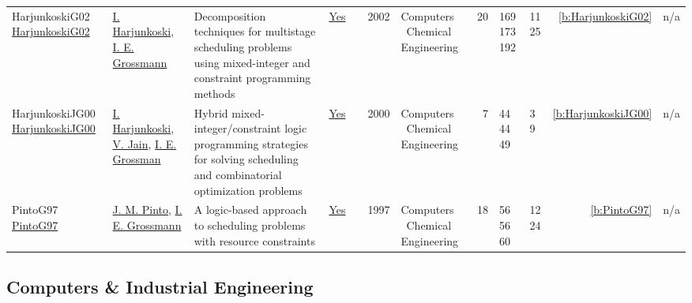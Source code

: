{\begin{longtable}{>{\raggedright\arraybackslash}p{3cm}>{\raggedright\arraybackslash}p{4.5cm}>{\raggedright\arraybackslash}p{6.0cm}rrrp{2.5cm}rp{1cm}p{1cm}rr}
HarjunkoskiG02 \href{http://dx.doi.org/10.1016/s0098-1354(02)00100-x}{HarjunkoskiG02} & \hyperref[auth:a871]{I. Harjunkoski}, \hyperref[auth:a382]{I. E. Grossmann} & Decomposition techniques for multistage scheduling problems using mixed-integer and constraint programming methods & \href{../works/HarjunkoskiG02.pdf}{Yes} & \cite{HarjunkoskiG02} & 2002 & Computers \  Chemical Engineering & 20 & 169 173 192 & 11 25 & \ref{b:HarjunkoskiG02} & n/a\\
HarjunkoskiJG00 \href{http://dx.doi.org/10.1016/s0098-1354(00)00470-1}{HarjunkoskiJG00} & \hyperref[auth:a871]{I. Harjunkoski}, \hyperref[auth:a844]{V. Jain}, \hyperref[auth:a1161]{I. E. Grossman} & Hybrid mixed-integer/constraint logic programming strategies for solving scheduling and combinatorial optimization problems & \href{../works/HarjunkoskiJG00.pdf}{Yes} & \cite{HarjunkoskiJG00} & 2000 & Computers \  Chemical Engineering & 7 & 44 44 49 & 3 9 & \ref{b:HarjunkoskiJG00} & n/a\\
PintoG97 \href{https://www.sciencedirect.com/science/article/pii/S0098135496003183}{PintoG97} & \hyperref[auth:a1256]{J. M. Pinto}, \hyperref[auth:a382]{I. E. Grossmann} & A logic-based approach to scheduling problems with resource constraints & \href{../works/PintoG97.pdf}{Yes} & \cite{PintoG97} & 1997 & Computers \  Chemical Engineering & 18 & 56 56 60 & 12 24 & \ref{b:PintoG97} & n/a\\
\end{longtable}
}

\subsection{Computers \& Industrial Engineering}

